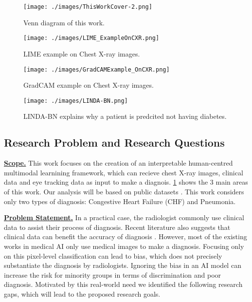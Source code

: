 \begin{figure}[!h]
    \centering
    \texttt{[image: ./images/ThisWorkCover-2.png]}
    \caption{Venn diagram of this work.}
    \label{fig: this_work_cover}
\end{figure}

\begin{figure}[!h]
    \centering
    \texttt{[image: ./images/LIME\_ExampleOnCXR.png]}
    \caption{LIME example on Chest X-ray images. \citep{Teixeira2021LIMEAndGradCAMOnCXR}}
    \label{fig: LIME_ExampleOnCXR}
\end{figure}

\begin{figure}[!h]
    \centering
    \texttt{[image: ./images/GradCAMExample\_OnCXR.png]}
    \caption{GradCAM example on Chest X-ray images. \citep{Teixeira2021LIMEAndGradCAMOnCXR}}
    \label{fig: GradCAMExample_OnCXR}
\end{figure}

\begin{figure}[!h]
    \centering
    \texttt{[image: ./images/LINDA-BN.png]}
    \caption{LINDA-BN explains why a patient is predcited not having diabetes. \citep{Moreira2021LINDA}}
    \label{fig: LINDA-BN_diabetes}
\end{figure}




\subsection{Research Problem and Research Questions}

\underline{\textbf{Scope.}} This work focuses on the creation of an interpretable human-centred multimodal learnining framework, which can recieve chest X-ray images, clinical data and eye tracking data as input to make a diagnois. \ref{fig: this_work_cover} shows the 3 main areas of this work. Our analysis will be based on public datasets \citep{Johnson2021MIMIC_IV, Johnson2019MIMIC_CXR, Johnson2021MIMIC_IV_ED, Lanfredi2021REFLACX, Karargyris2020EyeGazeDataset}. This work considers only two types of diagnosis: Congestive Heart Failure (CHF) and Pneumonia.

\noindent
\underline{\textbf{Problem Statement.}}
In a practical case, the radiologist commonly use clinical data to assist their process of diagnosis. Recent literature also suggests that clinical data can benefit the accuracy of diagnosis \citep{Castillo2020ClinicalInformationOnRadiology, Leslie2000CTClinicalData}. However, most of the existing works in medical AI only use medical images to make a diagnosis. Focusing only on this pixel-level classification can lead to bias, which does not precisely substantiate the diagnosis by radiologists. Ignoring the bias in an AI model can increase the risk for minority groups in terms of discrimination and poor diagnosis. Motivated by this real-world need we identified the following research gaps, which will lead to the proposed research goals.

